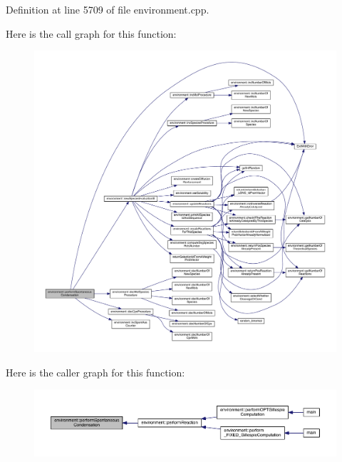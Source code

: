 Definition at line 5709 of file environment.\-cpp.



Here is the call graph for this function\-:
\nopagebreak
\begin{figure}[H]
\begin{center}
\leavevmode
\includegraphics[width=350pt]{a00014_acc764a05297ae00db52360f3df5ed1d5_cgraph}
\end{center}
\end{figure}




Here is the caller graph for this function\-:
\nopagebreak
\begin{figure}[H]
\begin{center}
\leavevmode
\includegraphics[width=350pt]{a00014_acc764a05297ae00db52360f3df5ed1d5_icgraph}
\end{center}
\end{figure}


